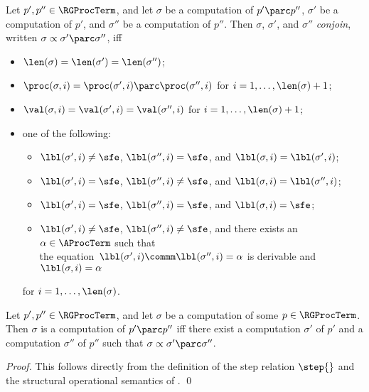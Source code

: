 \documentclass[runningheads]{llncs}
\begin{document}
Let $p',p'' \in \RGProcTerm$, and 
let $\sigma$ be a computation of $p' \parc p''$, 
$\sigma'$ be a computation of $p'$, and 
$\sigma''$ be a computation of $p''$.
Then $\sigma$, $\sigma'$, and $\sigma''$ \emph{conjoin},
written $\sigma \propto \sigma' \parc \sigma''$, iff
\begin{itemize}
\item
$\len(\sigma) = \len(\sigma') = \len(\sigma'')$;
\item
$\proc(\sigma,i) = \proc(\sigma',i) \parc \proc(\sigma'',i)$
for $i = 1, \ldots, \len(\sigma) + 1$;
\item
$\val(\sigma,i) = \val(\sigma',i) = \val(\sigma'',i)$
for $i = 1, \ldots, \len(\sigma) + 1$;
\item
one of the following:
\begin{itemize}
\item
$\lbl(\sigma',i) \neq \sfe$, $\lbl(\sigma'',i) = \sfe$, and
$\lbl(\sigma,i) = \lbl(\sigma',i)$;
\item
$\lbl(\sigma',i) = \sfe$, $\lbl(\sigma'',i) \neq \sfe$, and
$\lbl(\sigma,i) = \lbl(\sigma'',i)$;
\item
$\lbl(\sigma',i) = \sfe$, $\lbl(\sigma'',i) = \sfe$, and
$\lbl(\sigma,i) = \sfe$;
\item
$\lbl(\sigma',i) \neq \sfe$, $\lbl(\sigma'',i) \neq \sfe$, and
there exists an $\alpha \in \AProcTerm$ such that \\ the equation\,
$\lbl(\sigma',i) \commm \lbl(\sigma'',i) = \alpha$ is derivable and 
$\lbl(\sigma,i) = \alpha$
\end{itemize}
for $i = 1, \ldots, \len(\sigma)$.
\end{itemize}

\begin{lemma}
\label{lemma-conjoin}
Let $p',p'' \in \RGProcTerm$, and 
let $\sigma$ be a computation of some $p \in \RGProcTerm$.
Then $\sigma$ is a computation of $p' \parc p''$ iff
there exist a computation $\sigma'$ of $p'$ and a computation $\sigma''$ 
of $p''$ such that $\sigma \propto \sigma' \parc \sigma''$.
\end{lemma}
%
\begin{proof}
This follows directly from the definition of the step relation $\step{}$ 
and the structural operational semantics of \deACPei.
\qed
\end{proof}
\end{document}
